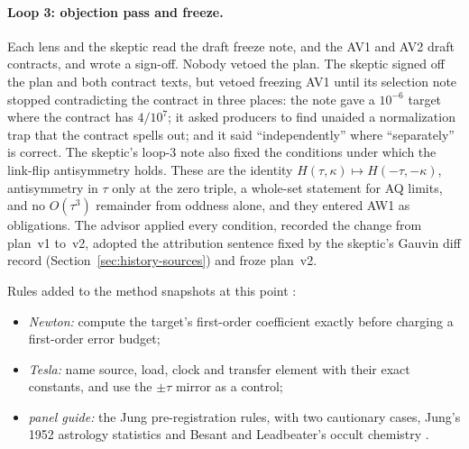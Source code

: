 \paragraph{Loop 3: objection pass and freeze.}
Each lens and the skeptic read the draft freeze note, 
and the AV1 and AV2 draft contracts, and wrote a sign-off. Nobody vetoed the
plan. The skeptic signed off the plan and both contract texts, but vetoed
freezing AV1 until its selection note stopped contradicting the contract in
three places: the note gave a $10^{-6}$ target where the contract has
$4/10^7$; it asked producers to find unaided a normalization trap that the
contract spells out; and it said ``independently'' where ``separately'' is
correct. The skeptic's loop-3 note also fixed the conditions under which the
link-flip antisymmetry holds. These are the identity
$H(\tau,\kappa)\mapsto H(-\tau,-\kappa)$, antisymmetry in $\tau$ only at the
zero triple, a whole-set statement for AQ limits, and no $O(\tau^3)$ remainder
from oddness alone, and they entered AW1 as obligations. The advisor applied
every condition, recorded the change from plan~v1 to~v2, adopted the
attribution sentence fixed by the skeptic's Gauvin diff record
(Section~\ref{sec:history-sources}) and froze plan~v2.

Rules added to the method snapshots at this point \cite{r32methods}:
\begin{itemize}
\item \emph{Newton:} compute the target's first-order coefficient exactly
before charging a first-order error budget;
\item \emph{Tesla:} name source, load, clock and transfer element with their
exact constants, and use the $\pm\tau$ mirror as a control;
\item \emph{panel guide:} the Jung pre-registration rules, with two
cautionary cases, Jung's 1952 astrology statistics and Besant and
Leadbeater's occult chemistry \cite{jungsync,besant}.
\end{itemize}

